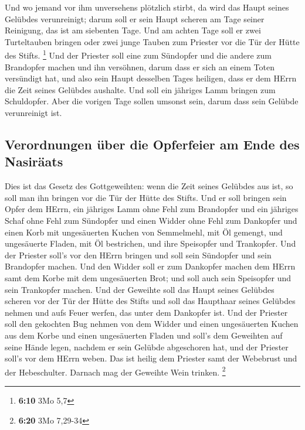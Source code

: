  Und wo jemand vor ihm unversehens plötzlich stirbt, da
wird das Haupt seines Gelübdes verunreinigt; darum soll er sein Haupt
scheren am Tage seiner Reinigung, das ist am siebenten Tage.
 Und am achten Tage soll er zwei Turteltauben bringen
oder zwei junge Tauben zum Priester vor die Tür der Hütte des Stifts.
\footnote{\textbf{6:10} 3Mo 5,7}  Und der Priester soll
eine zum Sündopfer und die andere zum Brandopfer machen und ihn
versöhnen, darum dass er sich an einem Toten versündigt hat, und also
sein Haupt desselben Tages heiligen,  dass er dem HErrn
die Zeit seines Gelübdes aushalte. Und soll ein jähriges Lamm bringen
zum Schuldopfer. Aber die vorigen Tage sollen umsonst sein, darum dass
sein Gelübde verunreinigt ist.

\hypertarget{verordnungen-uxfcber-die-opferfeier-am-ende-des-nasiruxe4ats}{%
\subsection{Verordnungen über die Opferfeier am Ende des
Nasiräats}\label{verordnungen-uxfcber-die-opferfeier-am-ende-des-nasiruxe4ats}}

 Dies ist das Gesetz des Gottgeweihten: wenn die Zeit
seines Gelübdes aus ist, so soll man ihn bringen vor die Tür der Hütte
des Stifts.  Und er soll bringen sein Opfer dem HErrn,
ein jähriges Lamm ohne Fehl zum Brandopfer und ein jähriges Schaf ohne
Fehl zum Sündopfer und einen Widder ohne Fehl zum Dankopfer
 und einen Korb mit ungesäuerten Kuchen von Semmelmehl,
mit Öl gemengt, und ungesäuerte Fladen, mit Öl bestrichen, und ihre
Speisopfer und Trankopfer.  Und der Priester soll's vor
den HErrn bringen und soll sein Sündopfer und sein Brandopfer machen.
 Und den Widder soll er zum Dankopfer machen dem HErrn
samt dem Korbe mit dem ungesäuerten Brot; und soll auch sein Speisopfer
und sein Trankopfer machen.  Und der Geweihte soll das
Haupt seines Gelübdes scheren vor der Tür der Hütte des Stifts und soll
das Haupthaar seines Gelübdes nehmen und aufs Feuer werfen, das unter
dem Dankopfer ist.  Und der Priester soll den gekochten
Bug nehmen von dem Widder und einen ungesäuerten Kuchen aus dem Korbe
und einen ungesäuerten Fladen und soll's dem Geweihten auf seine Hände
legen, nachdem er sein Gelübde abgeschoren hat,  und der
Priester soll's vor dem HErrn weben. Das ist heilig dem Priester samt
der Webebrust und der Hebeschulter. Darnach mag der Geweihte Wein
trinken. \footnote{\textbf{6:20} 3Mo 7,29-34}

